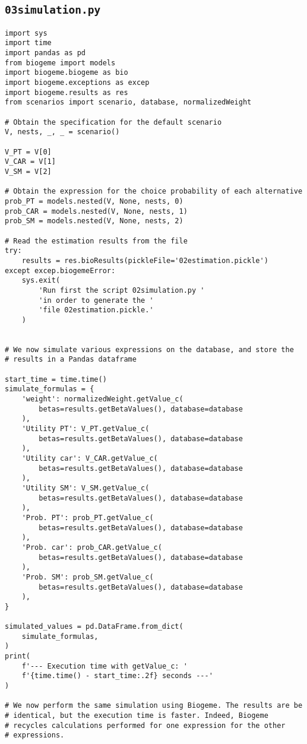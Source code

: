 \documentclass[12pt,a4paper]{article}
\begin{document}
\subsection{\lstinline$03simulation.py$}\label{sec:03simulation}
\begin{lstlisting}[style=numbers]
import sys
import time
import pandas as pd
from biogeme import models
import biogeme.biogeme as bio
import biogeme.exceptions as excep
import biogeme.results as res
from scenarios import scenario, database, normalizedWeight

# Obtain the specification for the default scenario
V, nests, _, _ = scenario()

V_PT = V[0]
V_CAR = V[1]
V_SM = V[2]

# Obtain the expression for the choice probability of each alternative
prob_PT = models.nested(V, None, nests, 0)
prob_CAR = models.nested(V, None, nests, 1)
prob_SM = models.nested(V, None, nests, 2)

# Read the estimation results from the file
try:
    results = res.bioResults(pickleFile='02estimation.pickle')
except excep.biogemeError:
    sys.exit(
        'Run first the script 02simulation.py '
        'in order to generate the '
        'file 02estimation.pickle.'
    )


# We now simulate various expressions on the database, and store the
# results in a Pandas dataframe

start_time = time.time()
simulate_formulas = {
    'weight': normalizedWeight.getValue_c(
        betas=results.getBetaValues(), database=database
    ),
    'Utility PT': V_PT.getValue_c(
        betas=results.getBetaValues(), database=database
    ),
    'Utility car': V_CAR.getValue_c(
        betas=results.getBetaValues(), database=database
    ),
    'Utility SM': V_SM.getValue_c(
        betas=results.getBetaValues(), database=database
    ),
    'Prob. PT': prob_PT.getValue_c(
        betas=results.getBetaValues(), database=database
    ),
    'Prob. car': prob_CAR.getValue_c(
        betas=results.getBetaValues(), database=database
    ),
    'Prob. SM': prob_SM.getValue_c(
        betas=results.getBetaValues(), database=database
    ),
}

simulated_values = pd.DataFrame.from_dict(
    simulate_formulas,
)
print(
    f'--- Execution time with getValue_c: '
    f'{time.time() - start_time:.2f} seconds ---'
)

# We now perform the same simulation using Biogeme. The results are be
# identical, but the execution time is faster. Indeed, Biogeme
# recycles calculations performed for one expression for the other
# expressions.


\end{lstlisting}
\end{document}

